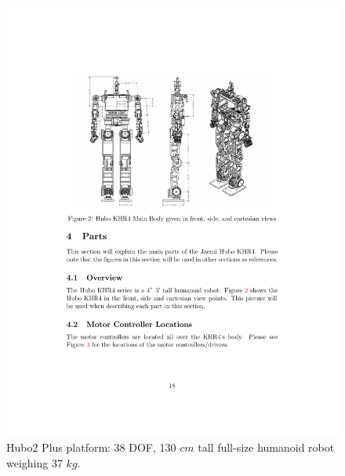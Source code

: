\begin{figure}[thpb]
  \centering
\includegraphics[width=1.0\columnwidth]{./pix/huboSkel.pdf}
  \caption{Hubo2 Plus platform: 38 DOF, 130 $cm$ tall full-size humanoid robot weighing 37 $kg$.}
  \label{fig:hubo}
\end{figure}



